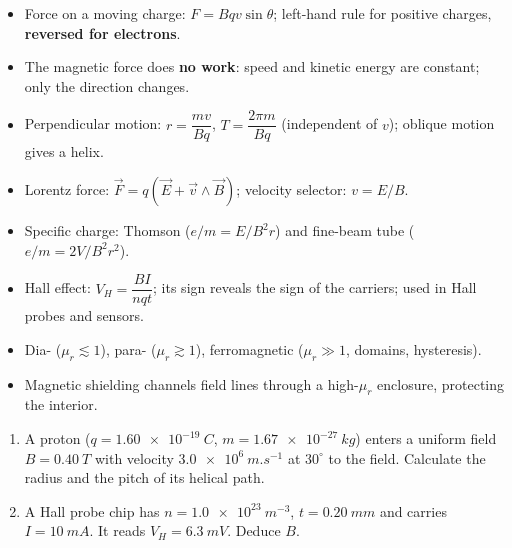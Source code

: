 \documentclass[11pt]{article}
\begin{document}
\begin{aretenir}
\begin{itemize}
\item Force on a moving charge: $F = Bqv\sin\theta$; left-hand rule for positive charges, \textbf{reversed for electrons}.
\item The magnetic force does \textbf{no work}: speed and kinetic energy are constant; only the direction changes.
\item Perpendicular motion: $r = \dfrac{mv}{Bq}$, $T = \dfrac{2\pi m}{Bq}$ (independent of $v$); oblique motion gives a helix.
\item Lorentz force: $\vec F = q(\vec E + \vec v\wedge\vec B)$; velocity selector: $v = E/B$.
\item Specific charge: Thomson ($e/m = E/B^{2}r$) and fine-beam tube ($e/m = 2V/B^{2}r^{2}$).
\item Hall effect: $V_H = \dfrac{BI}{nqt}$; its sign reveals the sign of the carriers; used in Hall probes and sensors.
\item Dia- ($\mu_r \lesssim 1$), para- ($\mu_r \gtrsim 1$), ferromagnetic ($\mu_r \gg 1$, domains, hysteresis).
\item Magnetic shielding channels field lines through a high-$\mu_r$ enclosure, protecting the interior.
\end{itemize}
\end{aretenir}

\begin{exercice}
\begin{enumerate}
\item A proton ($q = \SI{1.60e-19}{C}$, $m = \SI{1.67e-27}{kg}$) enters a uniform field $B = \SI{0.40}{T}$ with velocity $\SI{3.0e6}{m.s^{-1}}$ at $30^{\circ}$ to the field. Calculate the radius and the pitch of its helical path.
\item A Hall probe chip has $n = \SI{1.0e23}{m^{-3}}$, $t = \SI{0.20}{mm}$ and carries $I = \SI{10}{mA}$. It reads $V_H = \SI{6.3}{mV}$. Deduce $B$.
\end{enumerate}
\end{exercice}
\end{document}
